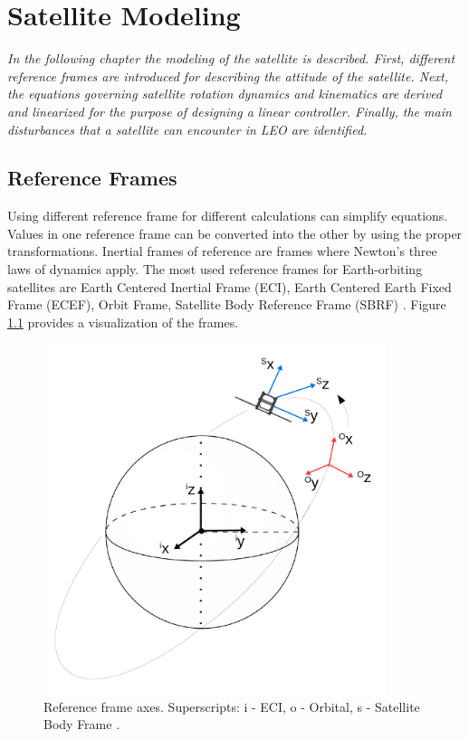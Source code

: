 \chapter{Satellite Modeling}
\textit{In the following chapter the modeling of the satellite is described. First, different reference frames are introduced for describing the attitude of the satellite. Next, the equations governing satellite rotation dynamics and kinematics are derived and linearized for the purpose of designing a linear controller. Finally, the main disturbances that a satellite can encounter in LEO are identified.}

\section{Reference Frames}


Using different reference frame for different calculations can simplify equations. Values in one reference frame can be converted into the other by using the proper transformations.
Inertial frames of reference are frames where Newton's three laws of dynamics apply.
The most used reference frames for Earth-orbiting satellites are Earth Centered Inertial Frame (ECI), Earth Centered Earth Fixed Frame (ECEF), Orbit Frame, Satellite Body Reference Frame (SBRF)  \cite{ref1} \cite{ref2}. Figure \ref{fig:frames} provides a visualization of the frames.
\begin{figure}[H]
	\centering 
	\includegraphics[width=100mm]{figures/frame.pdf}	
	\caption{Reference frame axes. Superscripts: i - ECI, o - Orbital, s - Satellite Body Frame \cite{PrevPro}.}
	\label{fig:frames}
\end{figure}

